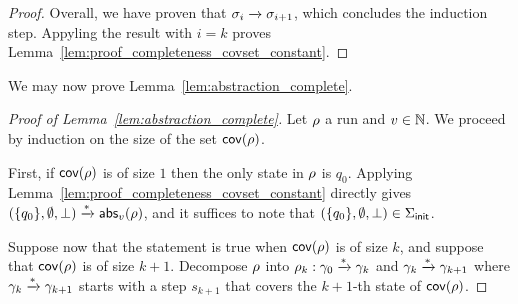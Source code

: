 \begin{proof}
Overall, we have proven that $\sigma_i \xrightarrow{} \sigma_{i+1}$, which concludes the induction step. Appyling the result with $i = k$ proves Lemma~\ref{lem:proof_completeness_covset_constant}. 

\end{proof}

We may now prove Lemma~\ref{lem:abstraction_complete}. 

\begin{proof}[Proof of Lemma~\ref{lem:abstraction_complete}]
Let $\rho$ a run and $v \in \mathbb{N}$.
We proceed by induction on the size of the set $\mathsf{cov}(\rho)$. 

First, if $\mathsf{cov}(\rho)$ is of size $1$ then the only state in $\rho$ is $q_0$. Applying Lemma~\ref{lem:proof_completeness_covset_constant} directly gives $(\{q_0\}, \emptyset, \bot) \xrightarrow{*} \mathsf{abs}_{v}(\rho)$, and it suffices to note that $(\{q_0\}, \emptyset, \bot) \in \Sigma_{\mathsf{init}}$. 

Suppose now that the statement is true when $\mathsf{cov}(\rho)$ is of size $k$, and suppose that $\mathsf{cov}(\rho)$ is of size $k+1$. Decompose $\rho$ into $\rho_k: \gamma_0 \xrightarrow{*} \gamma_k$ and $\gamma_k \xrightarrow{*} \gamma_{k+1}$ where $\gamma_k \xrightarrow{*} \gamma_{k+1}$ starts with a step $s_{k+1}$ that covers the $k+1$-th state of $\mathsf{cov}(\rho)$. 
\end{proof}

